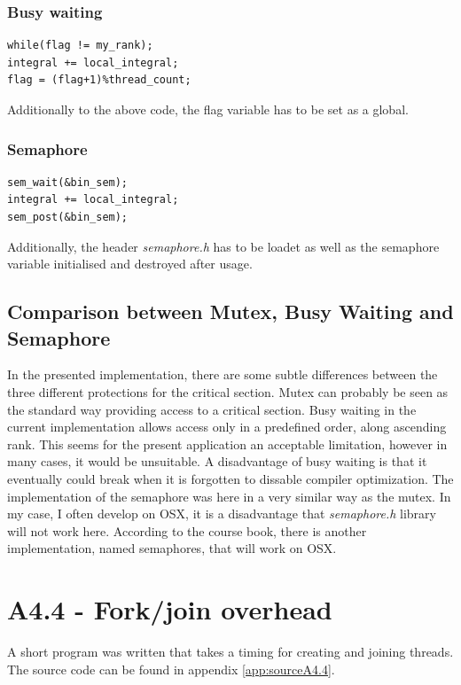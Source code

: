 \documentclass[a4paper,11pt,twoside]{article}
\begin{document}
\subsubsection{Busy waiting}
\begin{verbatim}
while(flag != my_rank);
integral += local_integral;
flag = (flag+1)%thread_count;
\end{verbatim}
Additionally to the above code, the flag variable has to be set as a global.

\subsubsection{Semaphore}
\begin{verbatim}
sem_wait(&bin_sem);
integral += local_integral;
sem_post(&bin_sem);
\end{verbatim}
Additionally, the header \textit{semaphore.h} has to be loadet as well as the semaphore variable initialised and destroyed after usage.

\subsection{Comparison between Mutex, Busy Waiting and Semaphore}
In the presented implementation, there are some subtle differences between the three different protections for the critical section. Mutex can probably be seen as the standard way providing access to a critical section. Busy waiting in the current implementation allows access only in a predefined order, along ascending rank. This seems for the present application an acceptable limitation, however in many cases, it would be unsuitable. A disadvantage of busy waiting is that it eventually could break when it is forgotten to dissable compiler optimization. The implementation of the semaphore was here in a very similar way as the mutex. In my case, I often develop on OSX, it is a disadvantage that \textit{semaphore.h} library will not work here. According to the course book, there is another implementation, named semaphores, that will work on OSX.  

\section{A4.4 - Fork/join overhead}
A short program was written that takes a timing for creating and joining threads. The source code can be found in appendix \ref{app:sourceA4.4}.
\end{document}
